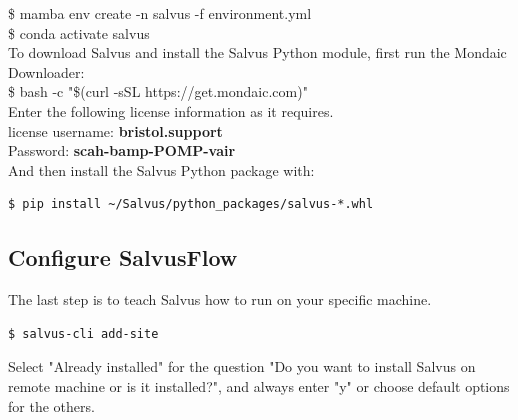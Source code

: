 \documentclass[a4paper, 12pt]{article}
\theoremstyle{plain}
\begin{document}
\noindent
\$  \hspace{0.1cm}mamba env create -n salvus -f environment.yml\\
\noindent
\$  \hspace{0.1cm}conda activate salvus\\

\noindent
To download Salvus and install the Salvus Python module, first run the Mondaic Downloader: \\

\noindent
\$  \hspace{0.1cm}bash -c "\$(curl -sSL https://get.mondaic.com)"\\

\noindent
Enter the following license information as it requires.\\
 
\noindent
license username: \textbf{bristol.support} \\
Password: \textbf{scah-bamp-POMP-vair}\\

\noindent
And then install the Salvus Python package with:



\noindent


\begin{verbatim}
$ pip install ~/Salvus/python_packages/salvus-*.whl
\end{verbatim}

\subsection*{Configure SalvusFlow}

The last step is to teach Salvus how to run on your specific machine.\\	


\begin{lstlisting}[language=bash]
$ salvus-cli add-site
\end{lstlisting}
\vspace{1cm}
Select "Already installed" for the question "Do you want to install Salvus on remote machine or is it installed?", and always enter "y" or choose default options for the others.
\end{document}
